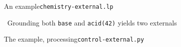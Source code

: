 \begin{frame}[fragile]{An example}{\texttt{chemistry-external.lp}}
  \smallskip
  
  \pause\smallskip
  
  \pause\medskip
   \ Grounding both \texttt{base} and \texttt{acid(42)} yields two externals
\end{frame}
\begin{frame}[fragile]{The example, processing}{\texttt{control-external.py}}
    \medskip
    
    \pause\medskip
    
\end{frame}
%
